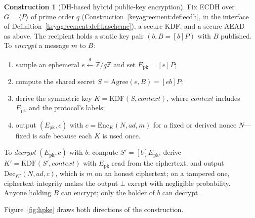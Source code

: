 \documentclass[11pt,a4paper]{article}
\theoremstyle{definition}
\newtheorem{construction}[theorem]{Construction}
\theoremstyle{remark}
\newcommand{\Z}{\ensuremath{\mathbb{Z}}}
\begin{document}
\begin{construction}[DH-based hybrid public-key encryption]
\label{keyagreement:def:hpke}
Fix ECDH over \(G = \langle P\rangle\) of prime order \(q\)
(Construction~\ref{keyagreement:def:ecdh}, in the interface of
Definition~\ref{keyagreement:def:kascheme}), a secure KDF, and a
secure AEAD as above. The recipient holds a static key pair
\((b, B = [b]P)\) with \(B\) published. To \emph{encrypt} a message
\(m\) to \(B\):
\begin{enumerate}
\item sample an ephemeral \(e \xleftarrow{\$} \Z/q\Z\) and set
  \(E_{\mathrm{pk}} = [e]P\);
\item compute the shared secret
  \(S = \mathrm{Agree}(e, B) = [eb]P\);
\item derive the symmetric key
  \(K = \mathrm{KDF}(S, \mathit{context})\), where
  \(\mathit{context}\) includes \(E_{\mathrm{pk}}\) and the
  protocol's labels;
\item output \((E_{\mathrm{pk}}, c)\) with
  \(c = \mathrm{Enc}_{K}(N, \mathit{ad}, m)\) for a fixed or derived
  nonce \(N\)---fixed is safe because each \(K\) is used once.
\end{enumerate}
To \emph{decrypt} \((E_{\mathrm{pk}}, c)\) with \(b\): compute
\(S' = [b]E_{\mathrm{pk}}\), derive
\(K' = \mathrm{KDF}(S', \mathit{context})\) with
\(E_{\mathrm{pk}}\) read from the ciphertext, and output
\(\mathrm{Dec}_{K'}(N, \mathit{ad}, c)\), which is \(m\) on an
honest ciphertext; on a tampered one, ciphertext integrity makes
the output \(\bot\) except with negligible probability. Anyone holding
\(B\) can encrypt; only the holder of \(b\) can decrypt.
\end{construction}

Figure~\ref{fig:hpke} draws both directions of the construction.
\end{document}
